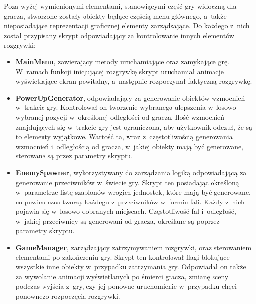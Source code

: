 Poza wyżej wymienionymi elementami, stanowiącymi część gry widoczną dla gracza, stworzone zostały obiekty będące częścią menu głównego, a~także nieposiadające reprezentacji graficznej elementy zarządzające. Do każdego z~nich został przypisany skrypt odpowiadający za kontrolowanie innych elementów rozgrywki:
\begin{itemize}
	\item \textbf{MainMenu}, zawierający metody uruchamiające oraz zamykające grę. W~ramach funkcji inicjującej rozgrywkę skrypt uruchamiał animacje wyświetlające ekran powitalny, a~następnie rozpoczynał faktyczną rozgrywkę.
	\item \textbf{PowerUpGenerator}, odpowiadający za generowanie obiektów wzmocnień w~trakcie gry. Kontrolował on tworzenie wybranego ulepszenia w~losowo wybranej pozycji w~określonej odległości od gracza. Ilość wzmocnień znajdujących się  w~trakcie gry jest ograniczona, aby użytkownik odczuł, że są to elementy wyjątkowe. Wartość ta, wraz z~częstotliwością generowania wzmocnień i~odległością od gracza, w~jakiej obiekty mają być generowane, sterowane są przez parametry skryptu. 
	\item \textbf{EnemySpawner}, wykorzystywany do zarządzania logiką odpowiadającą za generowanie przeciwników w~świecie gry. Skrypt ten posiadając określoną w~parametrze listę szablonów wrogich jednostek, które mają być generowane, co pewien czas tworzy każdego z~przeciwników w~formie fali. Każdy z~nich pojawia się w~losowo dobranych miejscach. Częstotliwość fal i~odległość, w~jakiej przeciwnicy są generowani od gracza, określane są poprzez parametry skryptu.
	\item \textbf{GameManager}, zarządzający zatrzymywaniem rozgrywki, oraz sterowaniem elementami po zakończeniu gry. Skrypt ten kontrolował flagi blokujące wszystkie inne obiekty w~przypadku zatrzymania gry. Odpowiadał on także za wywołanie animacji wyświetlanych po śmierci gracza, zmianę sceny podczas wyjścia z~gry, czy jej ponowne uruchomienie w~przypadku chęci ponownego rozpoczęcia rozgrywki.

\end{itemize}
